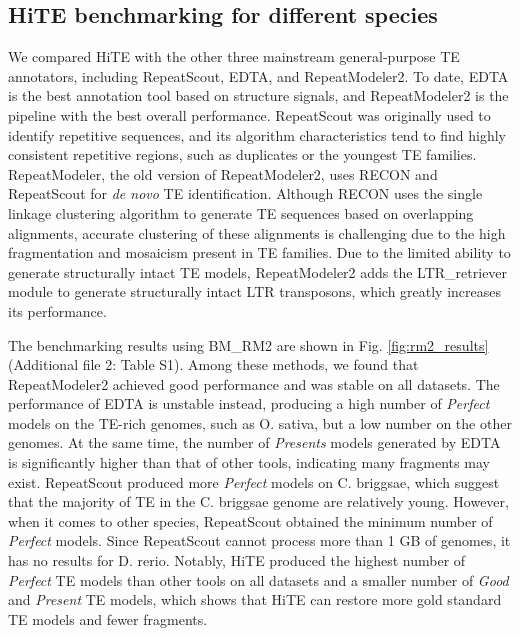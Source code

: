 \documentclass{bmcart}
\begin{document}
\subsection*{HiTE benchmarking for different species}
We compared HiTE with the other three mainstream general-purpose TE annotators, including RepeatScout, EDTA, and RepeatModeler2. To date, EDTA is the best annotation tool based on structure signals, and RepeatModeler2 is the pipeline with the best overall performance. RepeatScout was originally used to identify repetitive sequences, and its algorithm characteristics tend to find highly consistent repetitive regions, such as duplicates or the youngest TE families. %
RepeatModeler, the old version of RepeatModeler2, uses RECON and RepeatScout for \emph{de novo} TE identification. Although RECON uses the single linkage clustering algorithm to generate TE sequences based on overlapping alignments, accurate clustering of these alignments is challenging due to the high fragmentation and mosaicism present in TE families\cite{storer2022methodologies}. Due to the limited ability to generate structurally intact TE models, RepeatModeler2 adds the LTR\_retriever module to generate structurally intact LTR transposons, which greatly increases its performance\cite{flynn2020repeatmodeler2}.

The benchmarking results using BM\_RM2 are shown in Fig. \ref{fig:rm2_results} (Additional file 2: Table S1). Among these methods, we found that RepeatModeler2 achieved good performance and was stable on all datasets. The performance of EDTA is unstable instead, producing a high number of \emph{Perfect} models on the TE-rich genomes, such as O. sativa, but a low number on the other genomes. At the same time, the number of \emph{Presents} models generated by EDTA is significantly higher than that of other tools, indicating many fragments may exist. RepeatScout produced more \emph{Perfect} models on C. briggsae, which suggest that the majority of TE in the C. briggsae genome are relatively young. However, when it comes to other species, RepeatScout obtained the minimum number of \emph{Perfect} models. Since RepeatScout cannot process more than 1 GB of genomes, it has no results for D. rerio. Notably, HiTE produced the highest number of \emph{Perfect} TE models than other tools on all datasets and a smaller number of \emph{Good} and \emph{Present} TE models, which shows that HiTE can restore more gold standard TE models and fewer fragments. %
\end{document}
